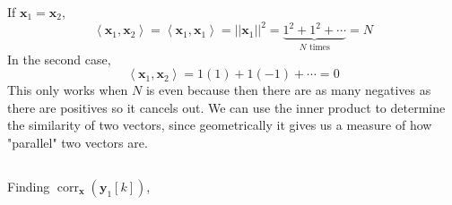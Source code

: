 \documentclass[]{article}
\newcommand{\iprod}[2]{\left\langle #1, #2 \right\rangle}
\renewcommand{\vec}[1]{\mathbf{#1}}
\newcommand{\corr}{\operatorname{corr}}
\begin{document}
If \(\vec{x}_1 = \vec{x}_2\), 
\begin{equation}
	\iprod{\vec{x}_1}{\vec{x}_2} = \iprod{\vec{x}_1}{\vec{x}_1} = ||\vec{x}_1||^2 = \underbrace{1^2 + 1^2 + \cdots}_{N \text{ times}} = N
\end{equation}
In the second case, 
\begin{equation}
	\iprod{\vec{x}_1}{\vec{x}_2} = 1(1) + 1(-1) + \cdots = 0
\end{equation}
This only works when \(N\) is even because then there are as many negatives as there are positives so it cancels out. 
We can use the inner product to determine the similarity of two vectors, since geometrically it gives us a measure of how "parallel" two vectors are. 

\subsection{}

Finding \(\corr_{\vec{x}}(\vec{y}_1[k])\), 
\end{document}
